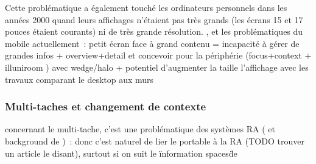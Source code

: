 
Cette problématique a également touché les ordinateurs personnels dans les années 2000 quand leurs affichages n'étaient pas très grands (les écrans 15 et 17 pouces étaient courants) ni de très grande résolution.
, et 
les problématiques du mobile actuellement~: petit écran face à grand contenu = incapacité à gérer de grandes infos 
+ overview+detail \cite{BergeSerranoPerelmanEtAl2014} et \cite{RashidNacentaQuigley2012}
concevoir pour la périphérie (focus+context \cite{CockburnKarlsonBederson2009}
+ illuniroom \cite{JonesBenkoOfekEtAl2013}) 
avec wedge/halo \cite{BaudischRosenholtz2003} \cite{GustafsonBaudischGutwinEtAl2008} \cite{BurigatChittaro2011} 
+ potentiel d'augmenter la taille l'affichage avec les travaux comparant le desktop aux murs \cite{LiuChapuisBeaudouin-LafonEtAl2014} \cite{ShuppBallYostEtAl2006} \cite{TanGergleScupelliEtAl2003}


\subsubsection*{Multi-taches et changement de contexte}
concernant le multi-tache, c'est une problématique des systèmes RA (\cite{SchmalstiegFuhrmannHesinaEtAl2002} et background de \cite{EnsFinneganIrani2014})~: donc c'est naturel de lier le portable à la RA (TODO trouver un article le disant), surtout si on suit le \"information spaces\" de \cite{EnsHincapie-RamosIrani2014}
\cite{TanCzerwinski2003}
\cite{RashidNacentaQuigley2012a}






